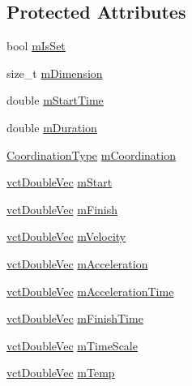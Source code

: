 \subsection*{Protected Attributes}
\begin{DoxyCompactItemize}
\item 
bool \hyperlink{classrob_l_s_p_b_a754306ed9e75319fdd5752dc564b1b85}{m\-Is\-Set}
\item 
size\-\_\-t \hyperlink{classrob_l_s_p_b_a2975b72bfeba86d33010dd9ea987ef3b}{m\-Dimension}
\item 
double \hyperlink{classrob_l_s_p_b_a8116b0fac995bf253c0f701c7ab7a00b}{m\-Start\-Time}
\item 
double \hyperlink{classrob_l_s_p_b_a79217b19223e3b08ca514250ce67bc4d}{m\-Duration}
\item 
\hyperlink{classrob_l_s_p_b_a8feec61f7c94670dbdbe75e63dec8496}{Coordination\-Type} \hyperlink{classrob_l_s_p_b_ade268d2bf36ea69e308acc6e60eeca91}{m\-Coordination}
\item 
\hyperlink{vct_dynamic_vector_types_8h_ade4b3068c86fb88f41af2e5187e491c2}{vct\-Double\-Vec} \hyperlink{classrob_l_s_p_b_ab1ad2d98754f2e0461f7853997293ea5}{m\-Start}
\item 
\hyperlink{vct_dynamic_vector_types_8h_ade4b3068c86fb88f41af2e5187e491c2}{vct\-Double\-Vec} \hyperlink{classrob_l_s_p_b_add5bdcfe3d89555a15bb2741c63ade5a}{m\-Finish}
\item 
\hyperlink{vct_dynamic_vector_types_8h_ade4b3068c86fb88f41af2e5187e491c2}{vct\-Double\-Vec} \hyperlink{classrob_l_s_p_b_a57058d6e24b9b68cd3b2327c5c523eb4}{m\-Velocity}
\item 
\hyperlink{vct_dynamic_vector_types_8h_ade4b3068c86fb88f41af2e5187e491c2}{vct\-Double\-Vec} \hyperlink{classrob_l_s_p_b_a8526c72ab0442d86ed6abcd6772aaf02}{m\-Acceleration}
\item 
\hyperlink{vct_dynamic_vector_types_8h_ade4b3068c86fb88f41af2e5187e491c2}{vct\-Double\-Vec} \hyperlink{classrob_l_s_p_b_af5da64a23030f4447e9e107a2f4e314a}{m\-Acceleration\-Time}
\item 
\hyperlink{vct_dynamic_vector_types_8h_ade4b3068c86fb88f41af2e5187e491c2}{vct\-Double\-Vec} \hyperlink{classrob_l_s_p_b_aa1e0ff251a01dca4a598caa294e2166d}{m\-Finish\-Time}
\item 
\hyperlink{vct_dynamic_vector_types_8h_ade4b3068c86fb88f41af2e5187e491c2}{vct\-Double\-Vec} \hyperlink{classrob_l_s_p_b_aa239e468d4cd7628eda3dd9a799c1742}{m\-Time\-Scale}
\item 
\hyperlink{vct_dynamic_vector_types_8h_ade4b3068c86fb88f41af2e5187e491c2}{vct\-Double\-Vec} \hyperlink{classrob_l_s_p_b_a5fdcfe010bf035e87654f2cd15e07d96}{m\-Temp}
\end{DoxyCompactItemize}


